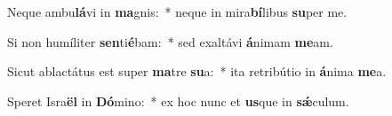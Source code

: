 \item Neque ambu\textbf{lá}vi in \textbf{ma}gnis:~* neque in mira\textbf{bí}libus \textbf{su}per me.
\item Si non humíliter \textbf{sen}ti\textbf{é}bam:~* sed exaltávi \textbf{á}nimam \textbf{me}am.
\item Sicut ablactátus est super \textbf{ma}tre \textbf{su}a:~* ita retribútio in \textbf{á}nima \textbf{me}a.
\item Speret Isra\textbf{ël} in \textbf{Dó}mino:~* ex hoc nunc et \textbf{us}que in \textbf{sǽ}culum.
